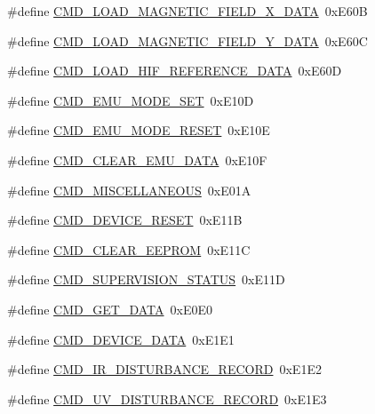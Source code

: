 \begin{DoxyCompactItemize}
\#define \hyperlink{a00086_a9e5d9d302e44daccbe233d321696b12c}{C\+M\+D\+\_\+\+L\+O\+A\+D\+\_\+\+M\+A\+G\+N\+E\+T\+I\+C\+\_\+\+F\+I\+E\+L\+D\+\_\+\+X\+\_\+\+D\+A\+T\+A}~0x\+E60\+B
\item 
\#define \hyperlink{a00086_ace011e2ba41b184650e8bd0ddbfa00d2}{C\+M\+D\+\_\+\+L\+O\+A\+D\+\_\+\+M\+A\+G\+N\+E\+T\+I\+C\+\_\+\+F\+I\+E\+L\+D\+\_\+\+Y\+\_\+\+D\+A\+T\+A}~0x\+E60\+C
\item 
\#define \hyperlink{a00086_afc4f83cb04e57ee185a039b10e19e297}{C\+M\+D\+\_\+\+L\+O\+A\+D\+\_\+\+H\+I\+F\+\_\+\+R\+E\+F\+E\+R\+E\+N\+C\+E\+\_\+\+D\+A\+T\+A}~0x\+E60\+D
\item 
\#define \hyperlink{a00086_ac80fdfdbada05f61256bef39c2064330}{C\+M\+D\+\_\+\+E\+M\+U\+\_\+\+M\+O\+D\+E\+\_\+\+S\+E\+T}~0x\+E10\+D
\item 
\#define \hyperlink{a00086_a48532ee6ce8c4c41bc6a972f66998ca6}{C\+M\+D\+\_\+\+E\+M\+U\+\_\+\+M\+O\+D\+E\+\_\+\+R\+E\+S\+E\+T}~0x\+E10\+E
\item 
\#define \hyperlink{a00086_aa5f71f685588bc4e978cd6d595a5ea81}{C\+M\+D\+\_\+\+C\+L\+E\+A\+R\+\_\+\+E\+M\+U\+\_\+\+D\+A\+T\+A}~0x\+E10\+F
\item 
\#define \hyperlink{a00086_a1c028104d44ece3aca38373da0345c04}{C\+M\+D\+\_\+\+M\+I\+S\+C\+E\+L\+L\+A\+N\+E\+O\+U\+S}~0x\+E01\+A
\item 
\#define \hyperlink{a00086_ac4c8a78ea50054745a0ac0792baa7657}{C\+M\+D\+\_\+\+D\+E\+V\+I\+C\+E\+\_\+\+R\+E\+S\+E\+T}~0x\+E11\+B
\item 
\#define \hyperlink{a00086_a9084e0a84e73318b6fad9841fb4d4f98}{C\+M\+D\+\_\+\+C\+L\+E\+A\+R\+\_\+\+E\+E\+P\+R\+O\+M}~0x\+E11\+C
\item 
\#define \hyperlink{a00086_ad6af9210ac0903986f3ac3e55c6816a3}{C\+M\+D\+\_\+\+S\+U\+P\+E\+R\+V\+I\+S\+I\+O\+N\+\_\+\+S\+T\+A\+T\+U\+S}~0x\+E11\+D
\item 
\#define \hyperlink{a00086_af89ae6f2252e558fc6e54ea9b452bf0e}{C\+M\+D\+\_\+\+G\+E\+T\+\_\+\+D\+A\+T\+A}~0x\+E0\+E0
\item 
\#define \hyperlink{a00086_a4412fcb90fb9171d432a624428881e70}{C\+M\+D\+\_\+\+D\+E\+V\+I\+C\+E\+\_\+\+D\+A\+T\+A}~0x\+E1\+E1
\item 
\#define \hyperlink{a00086_ad37cd290161f0a245d189c3f4e014d4e}{C\+M\+D\+\_\+\+I\+R\+\_\+\+D\+I\+S\+T\+U\+R\+B\+A\+N\+C\+E\+\_\+\+R\+E\+C\+O\+R\+D}~0x\+E1\+E2
\item 
\#define \hyperlink{a00086_ae45bb46748497c6a117beb1e93072d83}{C\+M\+D\+\_\+\+U\+V\+\_\+\+D\+I\+S\+T\+U\+R\+B\+A\+N\+C\+E\+\_\+\+R\+E\+C\+O\+R\+D}~0x\+E1\+E3

\end{DoxyCompactItemize}
